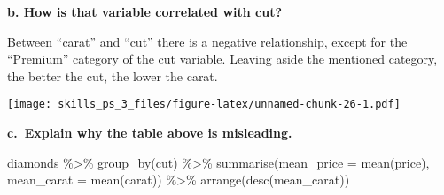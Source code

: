 \documentclass[
]{article}
\newenvironment{Shaded}{\begin{snugshade}}{\end{snugshade}}
\newcommand{\AttributeTok}[1]{\textcolor[rgb]{0.77,0.63,0.00}{#1}}
\newcommand{\CommentTok}[1]{\textcolor[rgb]{0.56,0.35,0.01}{\textit{#1}}}
\newcommand{\FloatTok}[1]{\textcolor[rgb]{0.00,0.00,0.81}{#1}}
\newcommand{\FunctionTok}[1]{\textcolor[rgb]{0.00,0.00,0.00}{#1}}
\newcommand{\NormalTok}[1]{#1}
\newcommand{\OtherTok}[1]{\textcolor[rgb]{0.56,0.35,0.01}{#1}}
\newcommand{\SpecialCharTok}[1]{\textcolor[rgb]{0.00,0.00,0.00}{#1}}
\newcommand{\StringTok}[1]{\textcolor[rgb]{0.31,0.60,0.02}{#1}}
\begin{document}
\textbf{b. How is that variable correlated with cut?}

Between ``carat'' and ``cut'' there is a negative relationship, except
for the ``Premium'' category of the cut variable. Leaving aside the
mentioned category, the better the cut, the lower the carat.

\begin{Shaded}
\end{Shaded}

\texttt{[image: skills\_ps\_3\_files/figure-latex/unnamed-chunk-26-1.pdf]}

\textbf{c.~Explain why the table above is misleading.}

\begin{Shaded}
\begin{Highlighting}[]
\NormalTok{diamonds }\SpecialCharTok{\%\textgreater{}\%}
  \FunctionTok{group\_by}\NormalTok{(cut) }\SpecialCharTok{\%\textgreater{}\%}
  \FunctionTok{summarise}\NormalTok{(}\AttributeTok{mean\_price =} \FunctionTok{mean}\NormalTok{(price), }\AttributeTok{mean\_carat =} \FunctionTok{mean}\NormalTok{(carat)) }\SpecialCharTok{\%\textgreater{}\%}
  \FunctionTok{arrange}\NormalTok{(}\FunctionTok{desc}\NormalTok{(mean\_carat))}
\end{Highlighting}
\end{Shaded}
\end{document}
